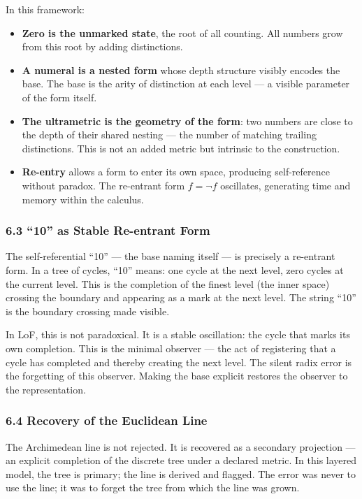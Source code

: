 \documentclass[
]{article}
\providecommand{\tightlist}{%
  \setlength{\itemsep}{0pt}\setlength{\parskip}{0pt}}
\begin{document}
In this framework:

\begin{itemize}
\tightlist
\item
  \textbf{Zero is the unmarked state}, the root of all counting. All
  numbers grow from this root by adding distinctions.
\item
  \textbf{A numeral is a nested form} whose depth structure visibly
  encodes the base. The base is the arity of distinction at each level
  --- a visible parameter of the form itself.
\item
  \textbf{The ultrametric is the geometry of the form}: two numbers are
  close to the depth of their shared nesting --- the number of matching
  trailing distinctions. This is not an added metric but intrinsic to
  the construction.
\item
  \textbf{Re-entry} allows a form to enter its own space, producing
  self-reference without paradox. The re-entrant form \(f = \neg f\)
  oscillates, generating time and memory within the calculus.
\end{itemize}

\subsubsection{6.3 ``10'' as Stable Re-entrant
Form}\label{as-stable-re-entrant-form}

The self-referential ``10'' --- the base naming itself --- is precisely
a re-entrant form. In a tree of cycles, ``10'' means: one cycle at the
next level, zero cycles at the current level. This is the completion of
the finest level (the inner space) crossing the boundary and appearing
as a mark at the next level. The string ``10'' is the boundary crossing
made visible.

In LoF, this is not paradoxical. It is a stable oscillation: the cycle
that marks its own completion. This is the minimal observer --- the act
of registering that a cycle has completed and thereby creating the next
level. The silent radix error is the forgetting of this observer. Making
the base explicit restores the observer to the representation.

\subsubsection{6.4 Recovery of the Euclidean
Line}\label{recovery-of-the-euclidean-line}

The Archimedean line is not rejected. It is recovered as a secondary
projection --- an explicit completion of the discrete tree under a
declared metric. In this layered model, the tree is primary; the line is
derived and flagged. The error was never to use the line; it was to
forget the tree from which the line was grown.
\end{document}
